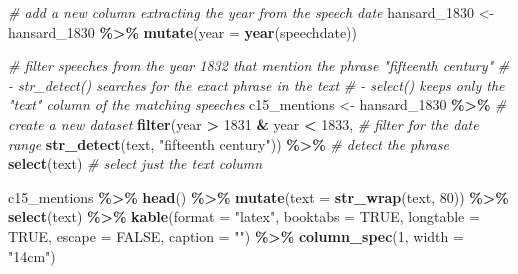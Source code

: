 \documentclass[
]{article}
\newenvironment{Shaded}{\begin{snugshade}}{\end{snugshade}}
\newcommand{\AttributeTok}[1]{\textcolor[rgb]{0.13,0.29,0.53}{#1}}
\newcommand{\CommentTok}[1]{\textcolor[rgb]{0.56,0.35,0.01}{\textit{#1}}}
\newcommand{\ConstantTok}[1]{\textcolor[rgb]{0.56,0.35,0.01}{#1}}
\newcommand{\DecValTok}[1]{\textcolor[rgb]{0.00,0.00,0.81}{#1}}
\newcommand{\FunctionTok}[1]{\textcolor[rgb]{0.13,0.29,0.53}{\textbf{#1}}}
\newcommand{\NormalTok}[1]{#1}
\newcommand{\OtherTok}[1]{\textcolor[rgb]{0.56,0.35,0.01}{#1}}
\newcommand{\SpecialCharTok}[1]{\textcolor[rgb]{0.81,0.36,0.00}{\textbf{#1}}}
\newcommand{\StringTok}[1]{\textcolor[rgb]{0.31,0.60,0.02}{#1}}
\begin{document}
\begin{Shaded}
\begin{Highlighting}[]
\CommentTok{\# add a new column extracting the year from the speech date}
\NormalTok{hansard\_1830 }\OtherTok{\textless{}{-}}\NormalTok{ hansard\_1830 }\SpecialCharTok{\%\textgreater{}\%}
  \FunctionTok{mutate}\NormalTok{(}\AttributeTok{year =} \FunctionTok{year}\NormalTok{(speechdate))}

\CommentTok{\# filter speeches from the year 1832 that mention the phrase "fifteenth century"}
\CommentTok{\# {-} str\_detect() searches for the exact phrase in the text}
\CommentTok{\# {-} select() keeps only the "text" column of the matching speeches}
\NormalTok{c15\_mentions }\OtherTok{\textless{}{-}}\NormalTok{ hansard\_1830 }\SpecialCharTok{\%\textgreater{}\%} \CommentTok{\# create a new dataset}
  \FunctionTok{filter}\NormalTok{(year }\SpecialCharTok{\textgreater{}} \DecValTok{1831} \SpecialCharTok{\&}\NormalTok{ year }\SpecialCharTok{\textless{}} \DecValTok{1833}\NormalTok{, }\CommentTok{\# filter for the date range}
         \FunctionTok{str\_detect}\NormalTok{(text, }\StringTok{"fifteenth century"}\NormalTok{)) }\SpecialCharTok{\%\textgreater{}\%} \CommentTok{\# detect the phrase}
  \FunctionTok{select}\NormalTok{(text) }\CommentTok{\# select just the text column}
\end{Highlighting}
\end{Shaded}

\begin{Shaded}
\begin{Highlighting}[]
\NormalTok{c15\_mentions }\SpecialCharTok{\%\textgreater{}\%}
  \FunctionTok{head}\NormalTok{() }\SpecialCharTok{\%\textgreater{}\%}
  \FunctionTok{mutate}\NormalTok{(}\AttributeTok{text =} \FunctionTok{str\_wrap}\NormalTok{(text, }\DecValTok{80}\NormalTok{)) }\SpecialCharTok{\%\textgreater{}\%}
  \FunctionTok{select}\NormalTok{(text) }\SpecialCharTok{\%\textgreater{}\%}
  \FunctionTok{kable}\NormalTok{(}\AttributeTok{format =} \StringTok{"latex"}\NormalTok{, }
        \AttributeTok{booktabs =} \ConstantTok{TRUE}\NormalTok{, }
        \AttributeTok{longtable =} \ConstantTok{TRUE}\NormalTok{, }
        \AttributeTok{escape =} \ConstantTok{FALSE}\NormalTok{,}
        \AttributeTok{caption =} \StringTok{""}\NormalTok{) }\SpecialCharTok{\%\textgreater{}\%}
  \FunctionTok{column\_spec}\NormalTok{(}\DecValTok{1}\NormalTok{, }\AttributeTok{width =} \StringTok{"14cm"}\NormalTok{)}
\end{Highlighting}
\end{Shaded}
\end{document}
